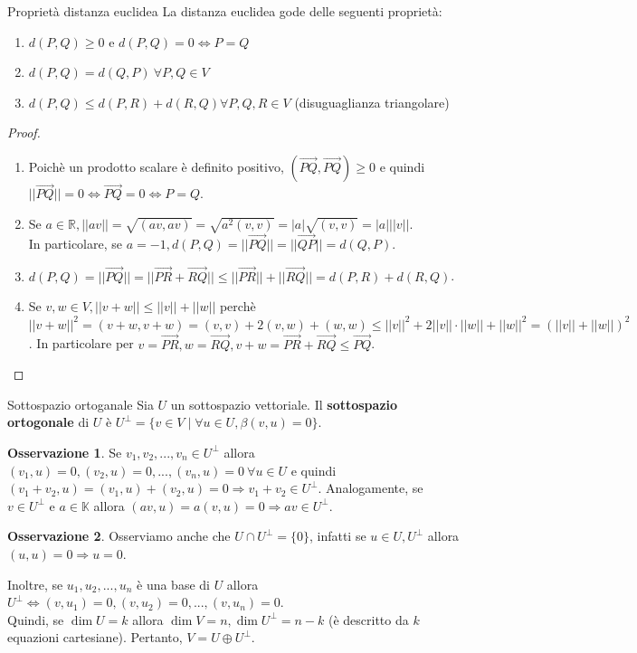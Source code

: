 \documentclass[a4paper]{article}
\theoremstyle{definition}
\newtheorem*{oss}{Osservazione}
\begin{document}
	\begin{teo}{Proprietà distanza euclidea}{}
		La distanza euclidea gode delle seguenti proprietà:
		\begin{enumerate}
			\item $d(P, Q) \ge 0$ e $d(P, Q) = 0 \Leftrightarrow P = Q$
			\item $d(P, Q) = d(Q, P) \ \forall P, Q \in V$
			\item $d(P, Q) \le d(P, R) + d(R, Q) \forall P, Q, R \in V$ (disuguaglianza triangolare)
		\end{enumerate}
	\end{teo}
	\begin{proof}
		\begin{enumerate}
			\item Poichè un prodotto scalare è definito positivo, $(\overrightarrow{PQ}, \overrightarrow{PQ}) \ge 0$ e quindi $||\overrightarrow{PQ}|| = 0 \Leftrightarrow \overrightarrow{PQ} = 0 \Leftrightarrow P = Q$.
			\item Se $a \in \mathbb{R}, ||av|| = \sqrt{(av, av)} = \sqrt{a^2(v, v)} = |a|\sqrt{(v, v)} = |a|||v||$. \\
			In particolare, se $a = -1, d(P, Q) = ||\overrightarrow{PQ}|| = ||\overrightarrow{QP}|| = d(Q, P)$.
			\item $d(P, Q) = ||\overrightarrow{PQ}|| = ||\overrightarrow{PR} + \overrightarrow{RQ}|| \le ||\overrightarrow{PR}|| + ||\overrightarrow{RQ}|| = d(P, R) + d(R, Q)$.
			\item Se $v, w \in V, ||v+w|| \le ||v|| + ||w||$ perchè $||v+w||^2 = (v+w, v+w) = (v, v) + 2(v, w) + (w, w) \le ||v||^2 + 2||v||\cdot||w|| + ||w||^2 = (||v|| + ||w||)^2$.
			In particolare per $v = \overrightarrow{PR}, w = \overrightarrow{RQ}, v + w = \overrightarrow{PR} + \overrightarrow{RQ} \le \overrightarrow{PQ}$.
		\end{enumerate}
	\end{proof}

	\begin{deff}{Sottospazio ortoganale}{}
		Sia $U$ un sottospazio vettoriale.
		Il \textbf{sottospazio ortogonale} di $U$ è $U^\perp = \{v \in V \mid \forall u \in U, \beta(v, u) = 0\}$.
	\end{deff}
	\begin{oss}
		Se $v_1, v_2, ..., v_n \in U^\perp$ allora $(v_1, u) = 0, (v_2, u) = 0, ..., (v_n, u) = 0 \ \forall u \in U$ e quindi $(v_1 + v_2, u) = (v_1, u) + (v_2, u) = 0 \Rightarrow v_1 + v_2 \in U^\perp$.
		Analogamente, se $v \in U^\perp$ e $a \in \mathbb{K}$ allora $(av, u) = a(v, u) = 0 \Rightarrow av \in U^\perp$.
	\end{oss}
	\begin{oss}
		Osserviamo anche che $U \cap U^\perp = \{0\}$, infatti se $u \in U, U^\perp$ allora $(u, u) = 0 \Rightarrow u = 0$.
	\end{oss}
	Inoltre, se $u_1, u_2, ..., u_n$ è una base di $U$ allora $U^\perp \Leftrightarrow (v, u_1) = 0, (v, u_2) = 0, ..., (v, u_n) = 0$. \\
	Quindi, se $\dim U = k$ allora $\dim V = n, \dim U^\perp = n - k$ (è descritto da $k$ equazioni cartesiane).
	Pertanto, $V = U \oplus U^\perp$.
\end{document}

